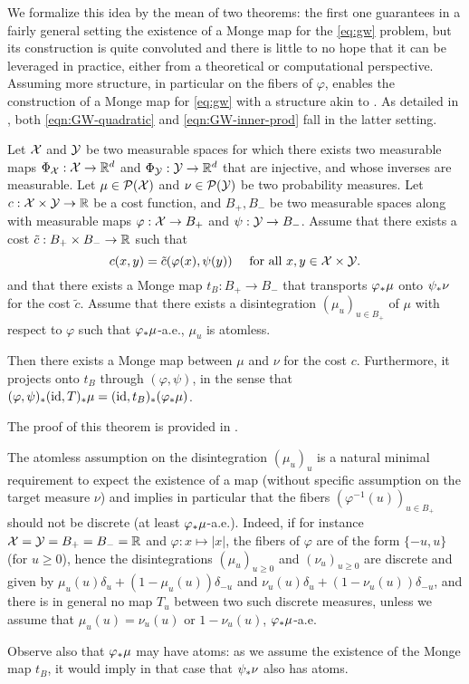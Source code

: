     We formalize this idea by the mean of two theorems: the first one guarantees in a fairly general setting the existence of a Monge map for the \eqref{eq:gw} problem, but its construction is quite convoluted and there is little to no hope that it can be leveraged in practice, either from a theoretical or computational perspective.
Assuming more structure, in particular on the fibers of $\varphi$, enables the construction of a Monge map for \eqref{eq:gw} with a structure akin to .
As detailed in , both \eqref{eqn:GW-quadratic} and \eqref{eqn:GW-inner-prod} fall in the latter setting.

\begin{theorem}\label{theo:fibers-nonsense}
    Let $\mathcal{X}$ and $\mathcal{Y}$ be two measurable spaces for which there exists two measurable maps $\Phi_{\mathcal{X}} : \mathcal{X} \to \mathbb{R}^d$ and $\Phi_{\mathcal{Y}} : \mathcal{Y} \to \mathbb{R}^d$
    that are injective, and whose inverses are measurable.
    Let $\mu \in \mathcal{P}(\mathcal{X})$ and $\nu \in \mathcal{P}(\mathcal{Y})$ be two probability measures.
    Let $c : \mathcal{X} \times \mathcal{Y} \to \mathbb{R}$ be a cost function, and $B_+,B_-$ be two measurable spaces along with measurable maps $\varphi : \mathcal{X} \to B_+$ and $\psi : \mathcal{Y} \to B_-$.
    Assume that there exists a cost $\tilde{c} : B_+ \times B_- \to \mathbb{R}$ such that
        \[ c(x,y)=\tilde c(\varphi(x),\psi(y))\quad \text{ for all } x,y\in \mathcal{X} \times \mathcal{Y}.\]
    and that there exists a Monge map $t_B : B_+ \to B_-$ that transports $\varphi _* \mu$ onto $\psi _* \nu$ for the cost $\tilde{c}$.
    Assume that there exists a disintegration $(\mu_u)_{u \in B_+}$ of $\mu$ with respect to $\varphi$ such that $\varphi_*\mu$-a.e., $\mu_u$ is atomless.

    Then there exists a Monge map between $\mu$ and $\nu$ for the cost $c$. Furthermore, it projects onto $t_B$ through $(\varphi,\psi)$, in the sense that $(\varphi,\psi)_*(\operatorname{id},T)_* \mu = (\operatorname{id}, t_B) _*(\varphi _* \mu)$.
\end{theorem}
The proof of this theorem is provided in .

\begin{remark}
The atomless assumption on the disintegration $(\mu_u)_u$ is a natural minimal requirement to expect the existence of a map (without specific assumption on the target measure $\nu$) and implies in particular that the fibers $(\varphi^{-1}(u))_{u \in B_+}$ should not be discrete (at least $\varphi_*\mu$-a.e.).
Indeed, if for instance $\mathcal{X} = \mathcal{Y} = B_+ = B_- = \mathbb{R}$ and $\varphi : x \mapsto |x|$, the fibers of $\varphi$ are of the form $\{-u, u\}$ (for $u \geq 0$), hence the disintegrations $(\mu_u)_{u \geq 0}$ and $(\nu_u)_{u \geq 0}$ are discrete and given by $\mu_u(u) \delta_u + (1-\mu_u(u)) \delta_{-u}$ and $\nu_u(u) \delta_u + (1-\nu_u(u)) \delta_{-u}$, and there is in general no map $T_u$ between two such discrete measures, unless we assume that $\mu_u(u) = \nu_u(u)$ or $1-\nu_u(u)$, $\varphi_*\mu$-a.e.

Observe also that $\varphi_*\mu$ may have atoms: as we assume the existence of the Monge map $t_B$, it would imply in that case that $\psi_*\nu$ also has atoms.
\end{remark}

